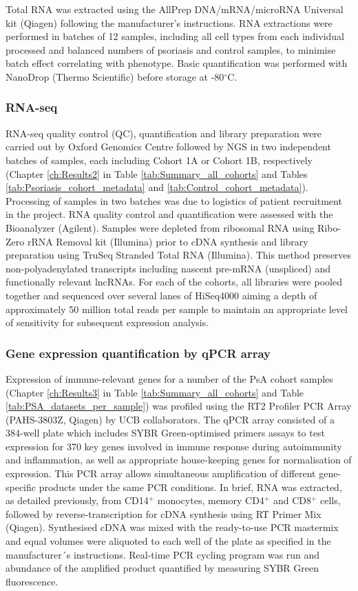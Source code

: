 Total RNA was extracted using the AllPrep DNA/mRNA/microRNA Universal kit (Qiagen) following the manufacturer's instructions. RNA extractions were performed in batches of 12 samples, including all cell types from each individual processed and balanced numbers of psoriasis and control samples, to minimise batch effect correlating with phenotype. Basic quantification was performed with NanoDrop (Thermo Scientific) before storage at -80{$^\circ$}C.

\subsubsection{RNA-seq}
RNA-seq quality control (QC), quantification and library preparation were carried out by Oxford Genomics Centre followed by NGS in two independent batches of samples, each including Cohort 1A or Cohort 1B, respectively (Chapter \ref{ch:Results2} in Table \ref{tab:Summary_all_cohorts} and Tables \ref{tab:Psoriasis_cohort_metadata} and \ref{tab:Control_cohort_metadata}). Processing of samples in two batches was due to logistics of patient recruitment in the project. RNA quality control and quantification were assessed with the Bioanalyzer (Agilent). Samples were depleted from ribosomal RNA using Ribo-Zero rRNA Removal kit (Illumina) prior to cDNA synthesis and library preparation using TruSeq Stranded Total RNA (Illumina). This method preserves non-polyadenylated transcripts including nascent pre-mRNA (unspliced) and functionally relevant lncRNAs. For each of the cohorts, all libraries were pooled together and sequenced over several lanes of HiSeq4000 aiming a depth of approximately 50 million total reads per sample to maintain an appropriate level of sensitivity for subsequent expression analysis.

\subsubsection{Gene expression quantification by qPCR array}
Expression of immune-relevant genes for a number of the PsA cohort samples (Chapter \ref{ch:Results3} in Table \ref{tab:Summary_all_cohorts} and Table \ref{tab:PSA_datasets_per_sample}) was profiled using the RT2 Profiler PCR Array (PAHS-3803Z, Qiagen) by UCB collaborators. The qPCR array consisted of a 384-well plate which includes SYBR Green-optimised primers assays to test expression for 370 key genes involved in immune response during autoimmunity and inflammation, as well as appropriate house-keeping genes for normalisation of expression. This PCR array allows simultaneous amplification of different gene-specific products under the same PCR conditions. In brief, RNA was extracted, as detailed previously, from CD14$^+$ monocytes, memory CD4$^+$ and CD8$^+$ cells, followed by reverse-transcription for cDNA synthesis using RT Primer Mix (Qiagen). Synthesised cDNA was mixed with the ready-to-use PCR mastermix and equal volumes were aliquoted to each well of the plate as specified in the manufacturer´s instructions. Real-time PCR cycling program was run and abundance of the amplified product quantified by measuring SYBR Green fluorescence. 



